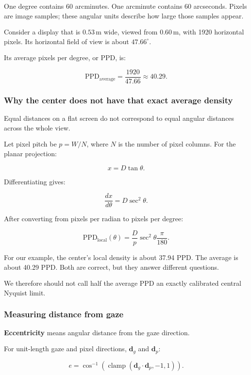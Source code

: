 One degree contains 60 arcminutes. One arcminute contains 60 arcseconds. Pixels are image samples; these angular units describe how large those samples appear.

Consider a display that is \(0.53\,\mathrm{m}\) wide, viewed from \(0.60\,\mathrm{m}\), with 1920 horizontal pixels. Its horizontal field of view is about \(47.66^\circ\).

Its average pixels per degree, or PPD, is:

\[
\mathrm{PPD}_{\mathrm{average}}
=\frac{1920}{47.66}
\approx40.29.
\]

\subsubsection{Why the center does not have that exact average density}\label{04-visual-computing-ii-ch043-why-the-center-does-not-have-that-exact-average-density}

Equal distances on a flat screen do not correspond to equal angular distances across the whole view.

Let pixel pitch be \(p=W/N\), where \(N\) is the number of pixel columns. For the planar projection:

\[
x=D\tan\theta.
\]

Differentiating gives:

\[
\frac{dx}{d\theta}=D\sec^2\theta.
\]

After converting from pixels per radian to pixels per degree:

\[
\mathrm{PPD}_{\mathrm{local}}(\theta)
=\frac{D}{p}\sec^2\theta\frac{\pi}{180}.
\]

For our example, the center's local density is about 37.94 PPD. The average is about 40.29 PPD. Both are correct, but they answer different questions.

We therefore should not call half the average PPD an exactly calibrated central Nyquist limit.

\subsubsection{Measuring distance from gaze}\label{04-visual-computing-ii-ch043-measuring-distance-from-gaze}

\textbf{Eccentricity} means angular distance from the gaze direction.

For unit-length gaze and pixel directions, \(\mathbf d_g\) and \(\mathbf d_p\):

\[
e=\cos^{-1}\left(
\operatorname{clamp}(\mathbf d_g\cdot\mathbf d_p,-1,1)
\right).
\]

